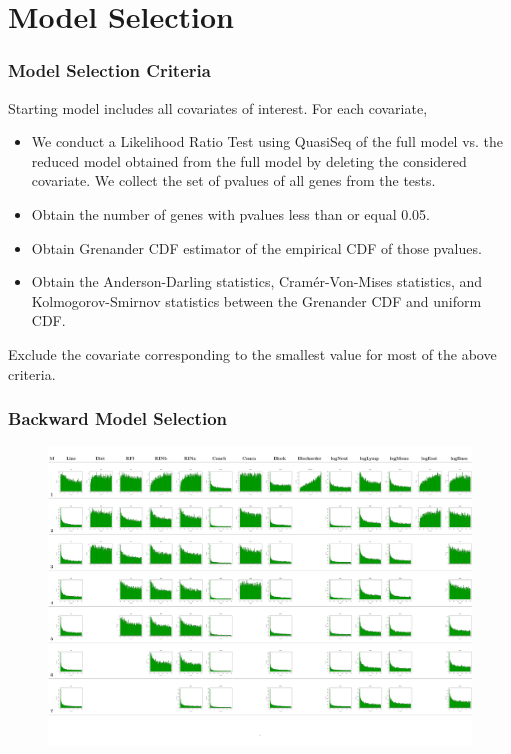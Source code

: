 \documentclass[handout,xcolor=pdftex,dvipsnames,table]{beamer}\usepackage[]{graphicx}\usepackage[]{color}
\begin{document}
\section{Model Selection}
\begin{frame}
\frametitle{Model Selection Criteria}
Starting model includes all  covariates of interest. For each covariate, 
\begin{itemize}
\setlength{\itemsep}{.2in}
\item We conduct a Likelihood Ratio Test using QuasiSeq of the full model vs. the reduced model obtained from the full model by deleting the considered covariate. We collect the set of pvalues of all genes from the tests. 

\item Obtain the number of genes with pvalues less than or equal 0.05. 
\item Obtain Grenander CDF estimator of the empirical CDF of those pvalues.
\item Obtain the Anderson-Darling statistics, Cram{\'e}r-Von-Mises statistics, and Kolmogorov-Smirnov statistics between the Grenander CDF and uniform CDF.
\end{itemize}
Exclude the covariate corresponding to the smallest value for most of the above criteria.
\end{frame}
\begin{frame}[fragile]
\frametitle{Backward Model Selection}
\begin{figure}[h!]
    \centering
    \includegraphics[width=\textwidth,height=1.4\textheight,keepaspectratio]{Plot07_022014_rficbcdat2.pdf}
    \end{figure}
\end{frame}
\end{document}
